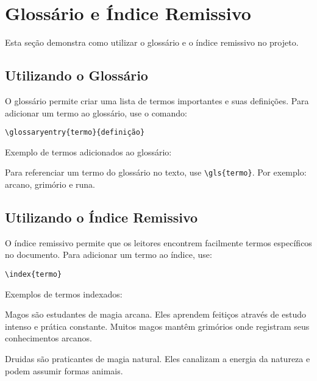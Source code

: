 \section{Glossário e Índice Remissivo}

Esta seção demonstra como utilizar o glossário e o índice remissivo no projeto.

\subsection{Utilizando o Glossário}

O glossário permite criar uma lista de termos importantes e suas definições. Para adicionar um termo ao glossário, use o comando:

\begin{verbatim}
\glossaryentry{termo}{definição}
\end{verbatim}

Exemplo de termos adicionados ao glossário:


Para referenciar um termo do glossário no texto, use \verb|\gls{termo}|. Por exemplo: 
\gls{arcano}, \gls{grimório} e \gls{runa}.

\subsection{Utilizando o Índice Remissivo}

O índice remissivo permite que os leitores encontrem facilmente termos específicos no documento. Para adicionar um termo ao índice, use:

\begin{verbatim}
\index{termo}
\end{verbatim}

Exemplos de termos indexados:

Magos são estudantes de magia arcana. Eles aprendem feitiços 
através de estudo intenso e prática constante. Muitos magos mantêm grimórios 
onde registram seus conhecimentos arcanos.

Druidas são praticantes de magia natural. Eles canalizam a 
energia da natureza e podem assumir formas animais.

